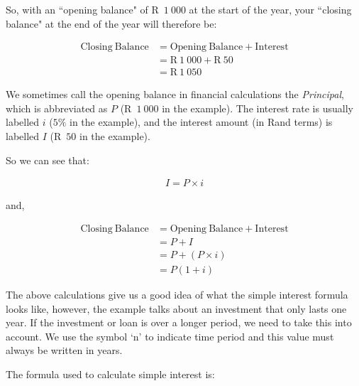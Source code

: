 So, with an ``opening balance" of R~$1~000$ at the start of the year, your ``closing balance" at the end of the year will therefore be:\par 
\begin{align*}
    \mathrm{Closing~Balance} &= \mathrm{Opening~Balance + Interest}\\
    &= \text{R}~1~000 + \text{R}~50\\
    &= \text{R}~1~050
\end{align*}

We sometimes call the opening balance in financial calculations the \textsl{Principal}, which is abbreviated as $P$ (R~$1~000$ in the example). The interest rate is usually labelled $i$ ($5\%$ in the example), and the interest amount (in Rand terms) is labelled $I$ (R~$50$ in the example).\par 

So we can see that:
        
\begin{align}
    I = P \times i
\end{align}

and,

\begin{align}
    \mathrm{Closing~Balance} &= \mathrm{Opening~Balance + Interest} \nonumber\\
    &= P + I \nonumber\\
    &= P + (P \times i)\nonumber\\
    &= P(1 + i)
\end{align}

The above calculations give us a good idea of what the simple interest formula looks like, however, the example talks
about an investment that only lasts one year. If the investment or loan is over a longer period, we need to take this
into account. We use the symbol ‘n’ to indicate time period and this value must always be written in years.\par

The formula used to calculate simple interest is:



